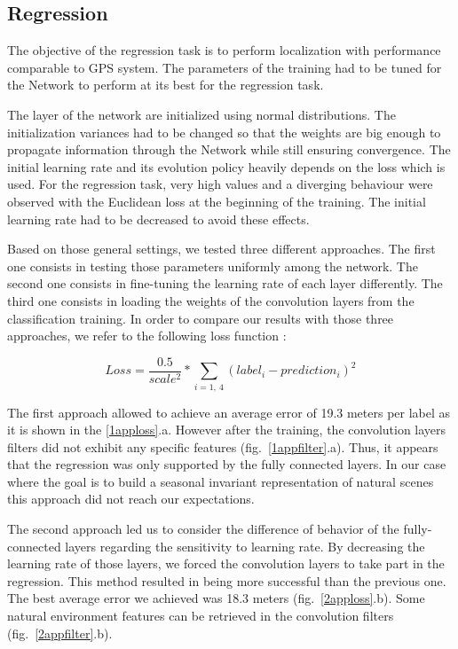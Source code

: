\subsection{Regression}
The objective of the regression task is to perform localization with performance comparable to GPS system. The parameters of the training had to be tuned for the Network to perform at its best for the regression task.

The layer of the network are initialized using normal distributions. The initialization variances had to be changed so that the weights are big enough to propagate information through the Network while still ensuring convergence.
The initial learning rate and its evolution policy heavily depends on the loss which is used. For the regression task, very high values and a diverging behaviour were observed with the Euclidean loss at the beginning of the training. The initial learning rate had to be decreased to avoid these effects.

Based on those general settings, we tested three different approaches. The first one consists in testing those parameters uniformly among the network. The second one consists in fine-tuning the learning rate of each layer differently. The third one consists in loading the weights of the convolution layers from the classification training. In order to compare our results with those three approaches, we refer to the following loss function :

\begin{equation} 
Loss = \frac{0.5}{scale^{2}}*\sum_{i=1,\ 4}(label_{i}-prediction_{i})^{2}
\end{equation}

The first approach allowed to achieve an average error of 19.3 meters per label as it is shown in the \ref{1apploss}.a. However after the training, the convolution layers filters did not exhibit any specific features (fig.~\ref{1appfilter}.a). Thus, it appears that the regression was only supported by the fully connected layers. In our case where the goal is to build a seasonal invariant representation of natural scenes this approach did not reach our expectations. 

The second approach led us to consider the difference of behavior of the fully-connected layers regarding the sensitivity to learning rate. By decreasing the learning rate of those layers, we forced the convolution layers to take part in the regression. This method resulted in being more successful than the previous one. The best average error we achieved was 18.3 meters (fig.~\ref{2apploss}.b). Some natural environment features can be retrieved in the convolution filters (fig.~\ref{2appfilter}.b).

